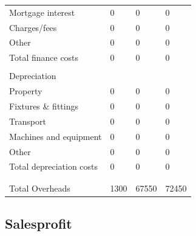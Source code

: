 \documentclass{article}
\begin{document}
\begin{table}[H]
\begin{tabular}{llll}
Mortgage interest                 & 0      & 0      & 0      \\
Charges/fees                      & 0      & 0      & 0      \\
Other                             & 0      & 0      & 0      \\
Total finance costs               & 0      & 0      & 0      \\
                                  &        &        &        \\
Depreciation                      &        &        &        \\
Property                          & 0      & 0      & 0      \\
Fixtures \& fittings              & 0      & 0      & 0      \\
Transport                         & 0      & 0      & 0      \\
Machines and equipment            & 0      & 0      & 0      \\
Other                             & 0      & 0      & 0      \\
Total depreciation costs          & 0      & 0      & 0      \\
                                  &        &        &        \\
                                  &        &        &        \\
Total Overheads                   & 1300   & 67550 & 72450
\end{tabular}
\end{table}




\subsection{Salesprofit}
\end{document}
